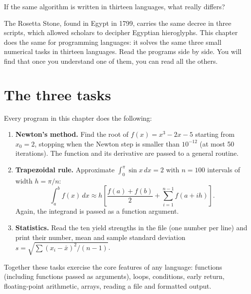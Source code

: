 {}
\label{ch:rosetta}

\begin{researchquestion}
If the same algorithm is written in thirteen languages, what really differs?
\end{researchquestion}

The Rosetta Stone, found in Egypt in 1799, carries the same decree in three scripts, which
allowed scholars to decipher Egyptian hieroglyphs. This chapter does the same for
programming languages: it solves the same three small numerical tasks in thirteen
languages. Read the programs side by side. You will find that once you understand one of
them, you can read all the others.


\section{The three tasks}

Every program in this chapter does the following:
\begin{enumerate}
\item \textbf{Newton's method.} Find the root of $f(x) = x^3 - 2x - 5$ starting from
  $x_0 = 2$, stopping when the Newton step is smaller than $10^{-12}$ (at most 50
  iterations). The function and its derivative are passed to a general 
  routine.
\item \textbf{Trapezoidal rule.} Approximate $\int_0^\pi \sin x \, dx = 2$ with
  $n = 100$ intervals of width $h = \pi/n$:
  \[
  \int_a^b f(x)\,dx \approx h\left[\frac{f(a) + f(b)}{2} + \sum_{i=1}^{n-1} f(a + ih)\right].
  \]
  Again, the integrand is passed as a function argument.
\item \textbf{Statistics.} Read the ten yield strengths in the file 
  (one number per line) and print their number, mean and sample standard deviation
  $s = \sqrt{\sum (x_i - \bar x)^2/(n-1)}$.
\end{enumerate}
Together these tasks exercise the core features of any language: functions (including
functions passed as arguments), loops, conditions, early return, floating-point
arithmetic, arrays, reading a file and formatted output.

